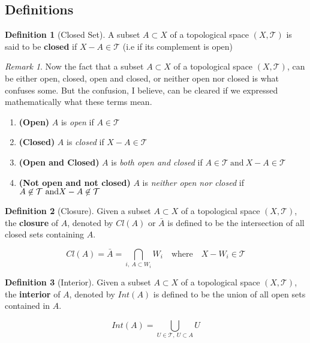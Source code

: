 \documentclass{article}
\theoremstyle{remark}
\newtheorem*{remark}{Remark}
\theoremstyle{definition}
\newtheorem{definition}{Definition}[section]
\begin{document}
\subsection{Definitions}

\begin{definition}[Closed Set]
A subset $A \subset X$ of a topological space $(X , \mathcal{T})$ is said to be \textbf{closed} if $X-A \in \mathcal{T}$ (i.e if its complement is open) 
\end{definition}

\begin{remark}
Now the fact that a subset $A \subset X$ of a topological space $(X, \mathcal{T})$, can be either open, closed, open and closed, or neither open nor closed is what confuses some. But the confusion, I believe, can be cleared if we expressed mathematically what these terms mean.

\begin{enumerate}
  \item \textbf{(Open)} $A$ is \textit{open} if $A \in \mathcal{T}$ 
  \item \textbf{(Closed)} $A$ is \textit{closed} if $X - A \in \mathcal{T}$
  \item \textbf{(Open and Closed)} $A$ is \textit{both open and closed} if $A \in \mathcal{T} \  \text{and} \ X - A \in \mathcal{T}$
  \item \textbf{(Not open and  not closed)} $A$ is \textit{neither open nor closed} if $A \not\in \mathcal{T} \  \text{and} \ \\X - A \not\in \mathcal{T}$ 
\end{enumerate}
\end{remark}

\medskip

\begin{definition}[Closure]
Given a subset $A \subset X$ of a topological space $(X , \mathcal{T})$, the \textbf{closure} of $A$, denoted by $Cl(A)$ or $\bar{A}$ is defined to be the intersection of all closed sets containing $A$.

$$Cl(A) = \bar{A} = \bigcap_{i , \  A \subset W_i} W_i \ \ \ \text{ where } \ \ \ X - W_i \in \mathcal{T}$$

\end{definition}

\begin{definition}[Interior]
Given a subset $A \subset X$ of a topological space $(X , \mathcal{T})$, the \textbf{interior} of $A$, denoted by $Int(A)$ is defined to be the union of all open sets contained in $A$.

$$Int(A) = \bigcup_{U \in \mathcal{T} , \  U \subset A} U $$

\end{definition}
\end{document}
